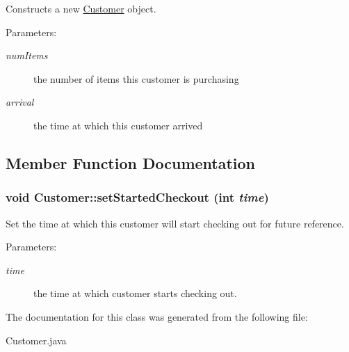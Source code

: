 Constructs a new \hyperlink{class_customer}{Customer} object. 

\begin{Desc}
\item[Parameters:]
\begin{description}
\item[{\em numItems}]the number of items this customer is purchasing \item[{\em arrival}]the time at which this customer arrived \end{description}
\end{Desc}


\subsection{Member Function Documentation}
\hypertarget{class_customer_70b41b48c5b37fc41bb1fce713edc743}{
\subsubsection[{setStartedCheckout}]{\setlength{\rightskip}{0pt plus 5cm}void Customer::setStartedCheckout (int {\em time})}}
\label{class_customer_70b41b48c5b37fc41bb1fce713edc743}


Set the time at which this customer will start checking out for future reference. 

\begin{Desc}
\item[Parameters:]
\begin{description}
\item[{\em time}]the time at which customer starts checking out. \end{description}
\end{Desc}


The documentation for this class was generated from the following file:\begin{CompactItemize}
\item 
Customer.java\end{CompactItemize}

